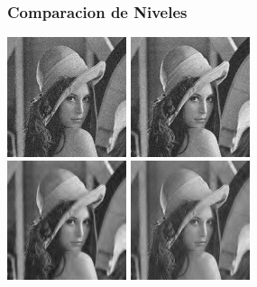 \documentclass{beamer}
\newcommand{\spaced}{\hspace{.2cm}}
\begin{document}
  \begin{frame}
    \frametitle{ Comparacion de Niveles }
    \centering
    \includegraphics[width=3.5cm]{imgs/Levels/1_normal_soft_sym8_Lenna.jpg}
    \spaced
    \includegraphics[width=3.5cm]{imgs/Levels/2_normal_soft_sym8_Lenna.jpg}
    \\
    \includegraphics[width=3.5cm]{imgs/Levels/4_normal_soft_sym8_Lenna.jpg}
    \spaced
    \includegraphics[width=3.5cm]{imgs/Levels/6_normal_soft_sym8_Lenna.jpg}
  
  \end{frame}
\end{document}
